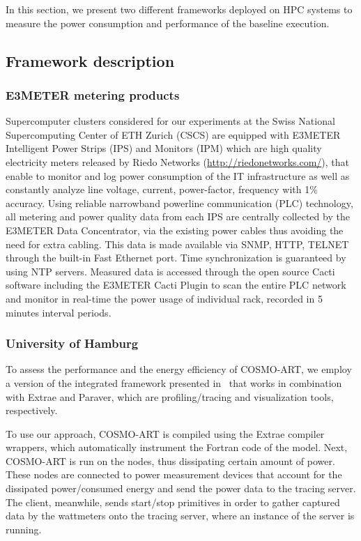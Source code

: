 In this section,  we present two different frameworks  deployed on HPC
systems  to  measure the  power  consumption  and  performance of  the
baseline execution. 

\subsection{Framework description}
\label{subsec:3.1}

\subsubsection{E3METER metering products}
Supercomputer  clusters considered  for our  experiments at  the Swiss
National Supercomputing Center of  ETH Zurich (CSCS) are equipped with
E3METER Intelligent  Power Strips (IPS)  and Monitors (IPM)  which are
high   quality   electricity  meters   released   by  Riedo   Networks
(\url{http://riedonetworks.com/}),  that  enable  to monitor  and  log
power  consumption of  the  IT infrastructure  as  well as  constantly
analyze  line  voltage,  current,  power-factor,  frequency  with  1\%
accuracy.   Using reliable  narrowband  powerline communication  (PLC)
technology,  all metering  and power  quality data  from each  IPS are
centrally collected by the E3METER Data Concentrator, via the existing
power cables thus  avoiding the need for extra  cabling.  This data is
made  available  via SNMP,  HTTP,  TELNET  through  the built-in  Fast
Ethernet  port.   Time  synchronization  is guaranteed  by  using  NTP
servers.   Measured data  is accessed  through the  open  source Cacti
software including  the E3METER  Cacti Plugin to  scan the  entire PLC
network and monitor  in real-time the power usage  of individual rack,
recorded in 5 minutes interval periods.

\subsubsection{University of Hamburg}
To assess the  performance and the energy efficiency  of COSMO-ART, we
employ   a    version   of   the    integrated   framework   presented
in~\cite{energy13} that works in  combination with Extrae and Paraver,
which are profiling/tracing and visualization tools, respectively.

To use our  approach, COSMO-ART is compiled using  the Extrae compiler
wrappers,  which  automatically instrument  the  Fortran  code of  the
model. Next, COSMO-ART  is run on the nodes,  thus dissipating certain
amount  of power.   These  nodes are  connected  to power  measurement
devices that account for the dissipated power/consumed energy and send
the power  data to  the tracing server.  The client,  meanwhile, sends
start/stop  primitives  in  order  to  gather  captured  data  by  the
wattmeters onto  the tracing server,  where an instance of  the \pmlib
server is running.

